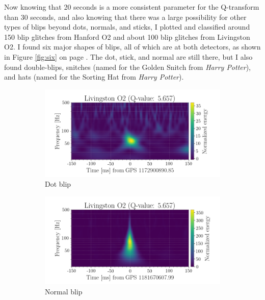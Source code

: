 \documentclass[a4paper]{article}
\begin{document}
Now knowing that 20 seconds is a more consistent parameter for the Q-transform than 30 seconds, and also knowing that there was a large possibility for other types of blips beyond dots, normals, and sticks, I plotted and classified around 150 blip glitches from Hanford O2 and about 100 blip glitches from Livingston O2. I found six major shapes of blips, all of which are at both detectors, as shown in Figure \ref{fig:six} on page \pageref{fig:six}. The dot, stick, and normal are still there, but I also found double-blips, snitches (named for the Golden Snitch from \textit{Harry Potter}), and hats (named for the Sorting Hat from \textit{Harry Potter}). 

\begin{figure}[h!]
	\centering
	\begin{subfigure}{.49\textwidth}
		\centering
		\includegraphics[width=1\linewidth]{dot_O2}
		\caption{Dot blip}
		\label{fig:dot_O2}
	\end{subfigure}
	\begin{subfigure}{.49\textwidth}
		\centering
		\includegraphics[width=1\linewidth]{normal_O2}
		\caption{Normal blip}
		\label{fig:normal_O2}
	\end{subfigure}
	\begin{subfigure}{.49\textwidth}

\end{subfigure}
\end{figure}
\end{document}
